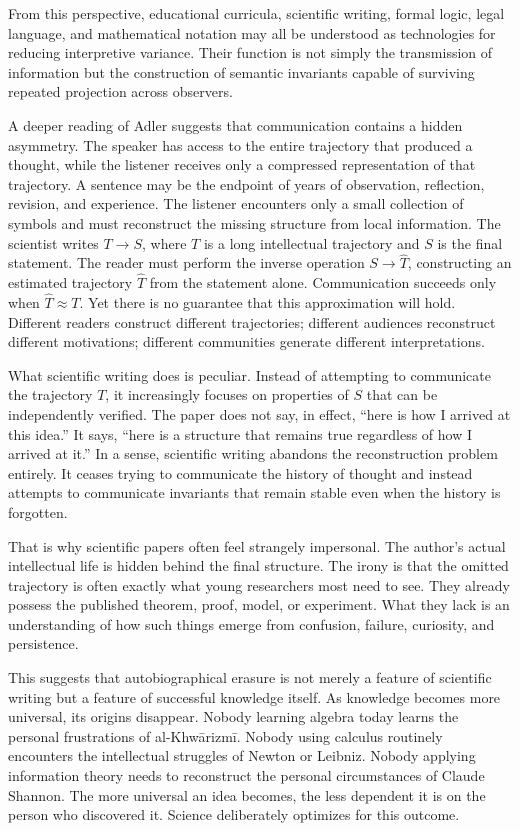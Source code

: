 \documentclass[11pt]{article}
\theoremstyle{plain}
\begin{document}
From this perspective, educational curricula, scientific writing, formal logic, legal language, and mathematical notation may all be understood as technologies for reducing interpretive variance. Their function is not simply the transmission of information but the construction of semantic invariants capable of surviving repeated projection across observers.

A deeper reading of Adler suggests that communication contains a hidden asymmetry. The speaker has access to the entire trajectory that produced a thought, while the listener receives only a compressed representation of that trajectory. A sentence may be the endpoint of years of observation, reflection, revision, and experience. The listener encounters only a small collection of symbols and must reconstruct the missing structure from local information. The scientist writes $T \rightarrow S$, where $T$ is a long intellectual trajectory and $S$ is the final statement. The reader must perform the inverse operation $S \rightarrow \hat T$, constructing an estimated trajectory $\hat T$ from the statement alone. Communication succeeds only when $\hat T \approx T$. Yet there is no guarantee that this approximation will hold. Different readers construct different trajectories; different audiences reconstruct different motivations; different communities generate different interpretations.

What scientific writing does is peculiar. Instead of attempting to communicate the trajectory $T$, it increasingly focuses on properties of $S$ that can be independently verified. The paper does not say, in effect, ``here is how I arrived at this idea.'' It says, ``here is a structure that remains true regardless of how I arrived at it.'' In a sense, scientific writing abandons the reconstruction problem entirely. It ceases trying to communicate the history of thought and instead attempts to communicate invariants that remain stable even when the history is forgotten.

That is why scientific papers often feel strangely impersonal. The author's actual intellectual life is hidden behind the final structure. The irony is that the omitted trajectory is often exactly what young researchers most need to see. They already possess the published theorem, proof, model, or experiment. What they lack is an understanding of how such things emerge from confusion, failure, curiosity, and persistence.

This suggests that autobiographical erasure is not merely a feature of scientific writing but a feature of successful knowledge itself. As knowledge becomes more universal, its origins disappear. Nobody learning algebra today learns the personal frustrations of al-Khw\=arizm\=i. Nobody using calculus routinely encounters the intellectual struggles of Newton or Leibniz. Nobody applying information theory needs to reconstruct the personal circumstances of Claude Shannon. The more universal an idea becomes, the less dependent it is on the person who discovered it. Science deliberately optimizes for this outcome.
\end{document}
